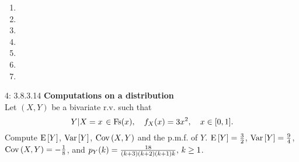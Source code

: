 \documentclass[a4paper,twoside=false,abstract=false,numbers=noenddot,
titlepage=false,headings=small,parskip=half,version=last]{scrartcl}
\begin{document}
\begin{solution}
    \begin{enumerate}
        \item
        \item
        \item
        \item
        \item
        \item
        \item
    \end{enumerate}
\end{solution}
\pagebreak

\begin{exercise}{4: 3.8.3.14} \textbf{Computations on a distribution} \\
    Let $(X,Y)$ be a bivariate r.v. such that
    \begin{equation}
        \left. Y \middle\vert X=x \right. \in \text{Fs}(x),\quad
        f_X(x)=3x^2,\quad
        x\in [0, 1].
    \end{equation}
    Compute ${\rm E}\,[Y]$, ${\rm Var}\,[Y]$, ${\rm Cov}\,(X, Y)$ and the p.m.f.
    of $Y$.
    \Answer
    ${{\rm E}\,[Y]=\frac{3}{2}}$,
    ${{\rm Var}\,[Y]=\frac{9}{4}}$,
    ${{\rm Cov}\,(X,Y)=-\frac{1}{8}}$, and
    $p_{Y} (k) = \frac{18}{(k+3)(k+2)(k+1)k},\, k \ge 1$.

\end{exercise}
\begin{solution}

\end{solution}
\pagebreak
\end{document}
